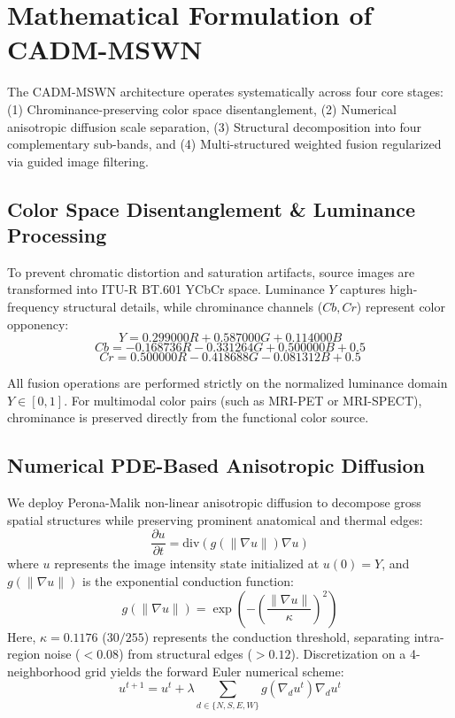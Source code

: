 \documentclass[conference]{IEEEtran}
\begin{document}
\section{Mathematical Formulation of CADM-MSWN}
The CADM-MSWN architecture operates systematically across four core stages: (1) Chrominance-preserving color space disentanglement, (2) Numerical anisotropic diffusion scale separation, (3) Structural decomposition into four complementary sub-bands, and (4) Multi-structured weighted fusion regularized via guided image filtering.

\subsection{Color Space Disentanglement \& Luminance Processing}
To prevent chromatic distortion and saturation artifacts, source images are transformed into ITU-R BT.601 YCbCr space. Luminance $Y$ captures high-frequency structural details, while chrominance channels ($Cb, Cr$) represent color opponency:
\begin{equation}
Y = 0.299000 R + 0.587000 G + 0.114000 B
\end{equation}
\begin{equation}
Cb = -0.168736 R - 0.331264 G + 0.500000 B + 0.5
\end{equation}
\begin{equation}
Cr = 0.500000 R - 0.418688 G - 0.081312 B + 0.5
\end{equation}

All fusion operations are performed strictly on the normalized luminance domain $Y \in [0, 1]$. For multimodal color pairs (such as MRI-PET or MRI-SPECT), chrominance is preserved directly from the functional color source.

\subsection{Numerical PDE-Based Anisotropic Diffusion}
We deploy Perona-Malik non-linear anisotropic diffusion to decompose gross spatial structures while preserving prominent anatomical and thermal edges:
\begin{equation}
\frac{\partial u}{\partial t} = \text{div}\left( g(\|\nabla u\|) \nabla u \right)
\end{equation}
where $u$ represents the image intensity state initialized at $u(0) = Y$, and $g(\|\nabla u\|)$ is the exponential conduction function:
\begin{equation}
g(\|\nabla u\|) = \exp\left( - \left( \frac{\|\nabla u\|}{\kappa} \right)^2 \right)
\end{equation}
Here, $\kappa = 0.1176$ ($30/255$) represents the conduction threshold, separating intra-region noise ($< 0.08$) from structural edges ($> 0.12$). Discretization on a 4-neighborhood grid yields the forward Euler numerical scheme:
\begin{equation}
u^{t+1} = u^t + \lambda \sum_{d \in \{N, S, E, W\}} g(\nabla_d u^t) \nabla_d u^t
\end{equation}
\end{document}
